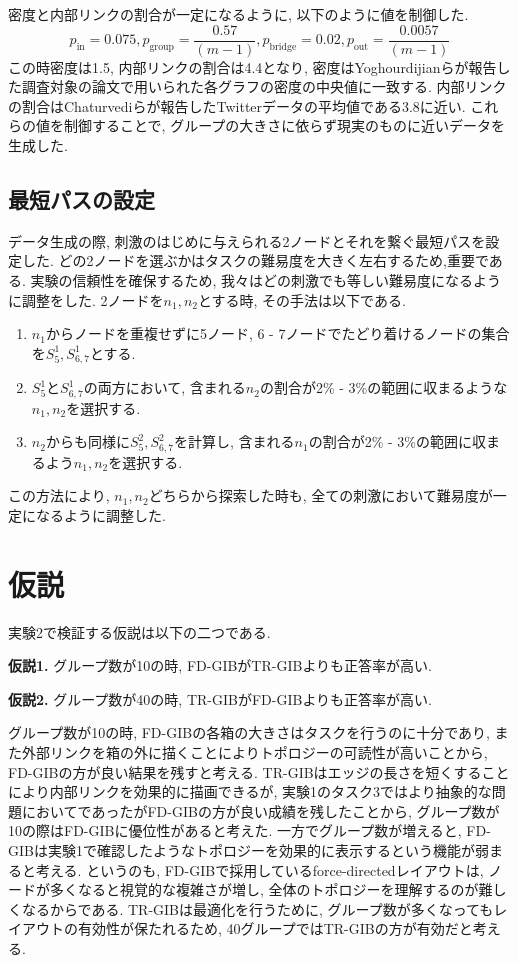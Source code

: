 \documentclass{kuee}
\begin{document}
密度と内部リンクの割合が一定になるように, 以下のように値を制御した.
\[
  p_{\text{in}} = 0.075, p_{\text{group}} = \frac{0.57}{(m-1)}, p_{\text{bridge}} = 0.02, p_{\text{out}} = \frac{0.0057}{(m-1)}
\]
この時密度は1.5, 内部リンクの割合は4.4となり, 密度はYoghourdijianら\cite{yoghourdjian2018exploring}が報告した調査対象の論文で用いられた各グラフの密度の中央値に一致する.
内部リンクの割合はChaturvediら\cite{chaturvedi2014group}が報告したTwitterデータの平均値である3.8に近い.
これらの値を制御することで, グループの大きさに依らず現実のものに近いデータを生成した.

\subsection{最短パスの設定}
\label{subsec:shortest_path}
データ生成の際, 刺激のはじめに与えられる2ノードとそれを繋ぐ最短パスを設定した.
どの2ノードを選ぶかはタスクの難易度を大きく左右するため,重要である.
実験の信頼性を確保するため, 我々はどの刺激でも等しい難易度になるように調整をした.
2ノードを$n_1, n_2$とする時, その手法は以下である.
\begin{enumerate}
  \item $n_1$からノードを重複せずに5ノード, 6 - 7ノードでたどり着けるノードの集合を$S_5^1, S_{6, 7}^1$とする.
  \item $S_5^1$と$S_{6, 7}^1$の両方において, 含まれる$n_2$の割合が2\% - 3\%の範囲に収まるような$n_1, n_2$を選択する.
  \item $n_2$からも同様に$S_5^2, S_{6, 7}^2$を計算し, 含まれる$n_1$の割合が2\% - 3\%の範囲に収まるよう$n_1, n_2$を選択する.
\end{enumerate}
この方法により, $n_1, n_2$どちらから探索した時も, 全ての刺激において難易度が一定になるように調整した.


\section{仮説}
\label{subsec:hypothesis-ex2}
実験2で検証する仮説は以下の二つである.
\begin{description}
  \item{\bf 仮説1.} グループ数が10の時, FD-GIBがTR-GIBよりも正答率が高い.
  \item{\bf 仮説2.} グループ数が40の時, TR-GIBがFD-GIBよりも正答率が高い.
\end{description}
グループ数が10の時, FD-GIBの各箱の大きさはタスクを行うのに十分であり, また外部リンクを箱の外に描くことによりトポロジーの可読性が高いことから, FD-GIBの方が良い結果を残すと考える.
TR-GIBはエッジの長さを短くすることにより内部リンクを効果的に描画できるが, 実験1のタスク3ではより抽象的な問題においてであったがFD-GIBの方が良い成績を残したことから, グループ数が10の際はFD-GIBに優位性があると考えた.
一方でグループ数が増えると, FD-GIBは実験1で確認したようなトポロジーを効果的に表示するという機能が弱まると考える.
というのも, FD-GIBで採用しているforce-directedレイアウトは, ノードが多くなると視覚的な複雑さが増し, 全体のトポロジーを理解するのが難しくなるからである.
TR-GIBは最適化を行うために, グループ数が多くなってもレイアウトの有効性が保たれるため, 40グループではTR-GIBの方が有効だと考える.
\end{document}
